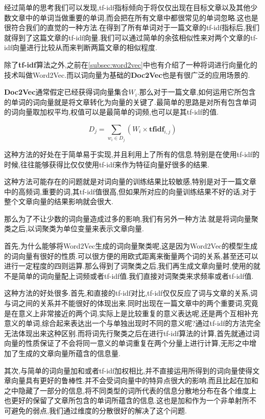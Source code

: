 经过简单的思考我们可以发现,tf-idf指标倾向于将仅仅出现在目标文章以及其他少数文章中的单词当做重要的单词,而会把在所有文章中都很常见的单词忽略.这也是很符合我们的直觉的一种方法.在得到了所有单词对于一篇文章的tf-idf指标后,我们就得到了这篇文章的tf-idf向量.我们可以通过简单的余弦相似性来对两个文章的tf-idf向量进行比较从而来判断两篇文章的相似程度.

除了\textbf{tf-idf}算法之外,之前在\ref{subsec:word2vec}中也有介绍了一种将词进行向量化的技术叫做Word2Vec.而以词向量为基础的\textbf{Doc2Vec}也是有很广泛的应用场景的.

\textbf{Doc2Vec}通常假定已经获得词向量集合${W_i}$.那么对于一篇文章,如何运用它所包含的单词的词向量就是将文章转化为向量的关键了.最简单的思路是对所有包含单词的词向量取加权平均,权值可以是最简单的词频,也可以是其tf-idf的值.

\begin{equation}
	D_j = \sum_{w_i \in D_j} (W_i \times \textbf{tfidf}_{i,j})
\end{equation}

这种方法的好处在于简单易于实现,并且利用上了所有的信息.特别是在使用tf-idf的时候,往往能够获得比仅仅使用tf-idf来作为特征向量好很多的结果.

这种方法可能存在的问题就是对词向量的训练结果比较敏感,特别是对于一篇文章中的高频词,重要的词,其tf-idf值很高,但如果所对应的向量训练结果不好的话,对于整个文章向量的结果影响就会很大.

那么为了不让少数的词向量造成过多的影响,我们有另外一种方法.就是将词向量聚类之后,以词聚类为单位变量来表示文章向量.

首先,为什么能够将Word2Vec生成的词向量聚类呢,这是因为Word2Vec的模型生成的词向量有很好的性质.可以很方便的用欧式距离来衡量两个词的关系,甚至还可以进行一定程度的四则运算.那么得到了词聚类之后,我们再生成文章向量时,使用的就不是简单的词向量配上词频或者tf-idf值.我们直接对词聚类来求频率或者tf-idf值.

这种方法的好处很多.首先,和直接的tf-idf对比,tf-idf仅仅反应了词与文章的关系,词与词之间的关系并不能很好的体现出来.同时出现在一篇文章中的两个重要词,究竟是在意义上非常接近的两个词,实际上是比较重复的意义表达呢,还是两个互相补充意义的单词,综合起来表达出一个与单独出现时不同的意义呢?通过tf-idf的方法完全无法体现出来这种区别.而将词先行聚类之后在进行tf-idf算法的计算,首先就通过词向量的性质保证了不会将同一意义的单词重复在两个分量上进行计算,无形之中增加了生成的文章向量所蕴含的信息量.

其次,与简单的词向量加和或者tf-idf加权相比,并不直接运用所得到的词向量使得文章向量具有更好的鲁棒性.并不会受词向量中的特异点很大的影响.而且比起在加和之中隐藏了一部分的信息,将不同类型的词所代表的信息分散地分布在各个维度上也更好的保留了文章所包含的单词所蕴含的信息.这也是加和作为一个非单射所不可避免的弱点,我们通过维度的分散很好的解决了这个问题.

